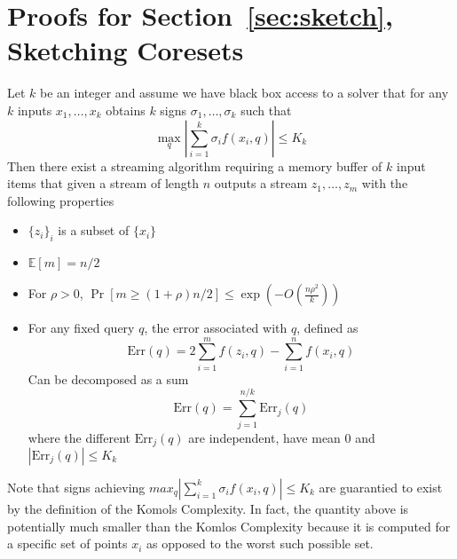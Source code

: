 \documentclass[anon,12pt]{colt2019} %
\newcommand{\E}{\mathbb{E}}
\renewcommand{\Pr}{\operatorname{Pr}}
\begin{document}



\appendix

\section{Proofs for Section~\ref{sec:sketch}, Sketching Coresets} \label{app:sketch proof}

\begin{lemma} \label{lem:compactor}
Let $k$ be an integer and assume we have black box access to a solver that for any $k$ inputs $x_1,\ldots,x_k$ obtains $k$ signs $\sigma_1,\ldots,\sigma_k$ such that
$$\max_q \left| \sum_{i=1}^{k} \sigma_i f(x_i, q)\right| \leq K_k$$
Then there exist a streaming algorithm requiring a memory buffer of $k$ input items that given a stream of length $n$ outputs a stream $z_1,\ldots,z_m$ with the following properties
\begin{itemize}
\item $\{z_i\}_i$ is a subset of $\{x_i\}$
\item $\E[m] = n/2$
\item For $\rho >0$, $\Pr[m \geq (1+\rho)n/2] \leq \exp \left( -O\left(\frac{n\rho^2}{k}\right)\right)$
\item For any fixed query $q$, the error associated with $q$, defined as
$$\text{Err}(q) = 2\sum_{i=1}^m f(z_i,q) - \sum_{i=1}^n f(x_i,q)  $$
Can be decomposed as a sum
$$\text{Err}(q) = \sum_{j=1}^{n/k} \text{Err}_j(q)$$
where the different $\text{Err}_j(q)$ are independent, have mean 0 and $|\text{Err}_j(q)| \leq K_k$
\end{itemize}
\end{lemma}

Note that signs achieving $max_q \left| \sum_{i=1}^{k} \sigma_i f(x_i, q)\right| \leq K_k$ are guarantied to exist by the definition of the Komols Complexity. In fact, the quantity above is potentially much smaller than the Komlos Complexity because it is computed for a specific set of points $x_i$ as opposed to the worst such possible set. 
\end{document}
